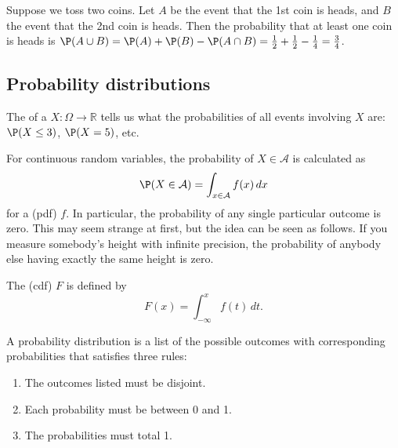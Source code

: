 
\begin{example}%
Suppose we toss two coins. Let $A$ be the event that the 1st coin is heads, and $B$ the event that the 2nd coin is heads.
Then the probability that at least one coin is heads is $\P(A\cup B)=\P(A)+\P(B)-\P(A\cap B)=\frac12+\frac12-\frac14 = \frac34$.
\end{example}

\subsection{Probability distributions}



The  of a  $X:\Omega\to\mathbb R$ tells us what the probabilities of all events involving $X$ are: $\P(X\le 3)$, $\P(X=5)$, etc.

For continuous random variables, the probability of $X\in\mathcal A$ is calculated as
\[
	\P(X\in\mathcal A) = \int_{x\in \mathcal A} f(x)\,dx
\]
for a  (pdf) $f$. In particular, the probability of any single particular outcome is zero. This may seem strange at first, but the idea can be seen as follows. If you measure somebody's height with infinite precision, the probability of anybody else having exactly the same height is zero.

The  (cdf) $F$ is defined by
\[
	F(x)=\int_{-\infty}^x f(t)\,dt.
\]

\begin{termBox}{
A probability distribution is a list of the possible outcomes with corresponding probabilities that satisfies three rules: \vspace{-2mm}
\begin{enumerate}
\setlength{\itemsep}{0mm}
\item The outcomes listed must be disjoint.
\item Each probability must be between 0 and 1.
\item The probabilities must total 1. \vspace{1mm}
\end{enumerate}}
\end{termBox}

